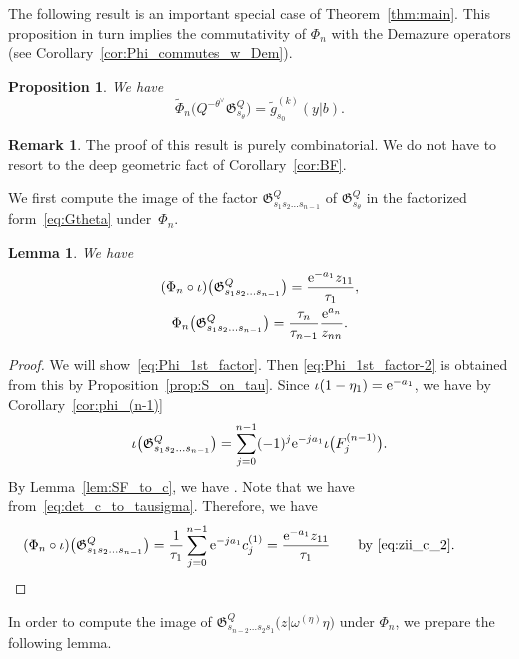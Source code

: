 \documentclass[10pt,a4paper]{amsart}
\numberwithin{equation}{section}
\newcommand{\Gro}[1]{\mathfrak{G}^Q_{#1}}
\newtheorem{Lemma}[Theorem]{Lemma}
\newtheorem{Proposition}[Theorem]{Proposition}
\theoremstyle{definition}
\newtheorem{Remark}[Theorem]{Remark}
\begin{document}
The following result is an important special case of Theorem~\ref{thm:main}.
This proposition in turn implies the commutativity of $\Phi_n$ with the Demazure operators (see Corollary~\ref{cor:Phi_commutes_w_Dem}).

\begin{Proposition}
\label{prop:key} We have
\[
\tilde{\Phi}_n\bigl(Q^{-\theta^\vee}\Gro{s_\theta}\bigr)=\tilde{g}_{s_0}^{(k)}(y|b).
\]
\end{Proposition}
\begin{Remark}The proof of this result is purely combinatorial.
We do not have to resort to
the deep geometric fact of Corollary~\ref{cor:BF}.
\end{Remark}

We first compute
the image of
the factor
$\Gro{s_1s_2\dots s_{n-1}}$ of $\Gro{s_\theta}$
in the factorized form~\eqref{eq:Gtheta} under~$\Phi_n$.
\begin{Lemma}\label{lem:Phi_1st_factor}
We have
\begin{gather}
 (\Phi_n\circ \iota)\bigl(\Gro{s_1s_2\dots s_{n-1}}\bigr)=
\frac{{\rm e}^{-a_1}z_{11}}{\tau_1},\label{eq:Phi_1st_factor}
 \\
 \Phi_n\bigl(\Gro{s_1s_2\dots s_{n-1}}\bigr)=
 \frac{\tau_n}{\tau_{n-1}}
 \frac{{\rm e}^{a_n}}{z_{nn}}.\label{eq:Phi_1st_factor-2}
\end{gather}
\end{Lemma}
\begin{proof}
 We will show~\eqref{eq:Phi_1st_factor}. Then
 \eqref{eq:Phi_1st_factor-2} is obtained from this by Proposition~\ref{prop:S_on_tau}.
Since $\iota(1-\eta_{1})={\rm e}^{-a_1}$, we have by Corollary~\ref{cor:phi_(n-1)}
\[
\iota\bigl(\Gro{s_1s_2\dots s_{n-1}}\bigr)=
\sum_{j=0}^{n-1}(-1)^j{\rm e}^{-ja_1}\iota\bigl(F_j^{(n-1)}\bigr).
\]
 By Lemma~\ref{lem:SF_to_c}, we have
.
Note that we have~ from~\eqref{eq:det_c_to_tausigma}.
Therefore, we have
\begin{align*}
(\Phi_n\circ \iota)
\bigl(\Gro{s_1s_2\dots s_{n-1}}\bigr)
&=\frac{1}{\tau_1}
\sum_{j=0}^{n-1}{\rm e}^{-ja_1}
c_j^{(1)}=\frac{{\rm e}^{-a_1}z_{11}}{\tau_1}
\qquad \text{by~\eqref{eq:zii_c_2}}.\tag*{\qed}
\end{align*}\renewcommand{\qed}{}
\end{proof}
 In order to compute the image of
 $\Gro{s_{n-2}\dots s_2s_{1}}\bigl(z|\omega^{(\eta)}\eta\bigr)$ under $\Phi_n$, we prepare
 the following lemma.
\end{document}
